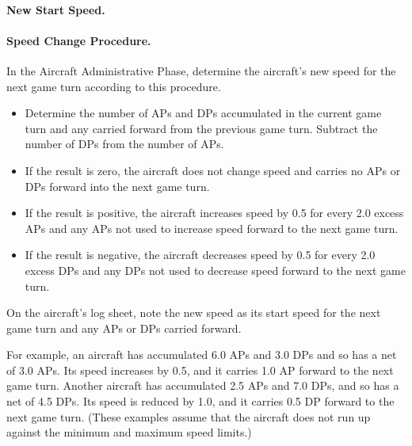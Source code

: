 {\paragraph{New Start Speed.} 

}{

\paragraph{Speed Change Procedure.} 

In the Aircraft Administrative Phase, determine the aircraft’s new speed for the next game turn according to this procedure. 

\begin{itemize}
\item Determine the number of APs and DPs accumulated in the current game turn and any carried forward from the previous game turn. Subtract the number of DPs from the number of APs.

\item If the result is zero, the aircraft does not change speed and carries no APs or DPs forward into the next game turn.

\item If the result is positive, the aircraft increases speed by 0.5 for every 2.0 excess APs and any APs not used to increase speed forward to the next game turn.

\item If the result is negative, the aircraft decreases speed by 0.5 for every 2.0 excess DPs and any DPs not used to decrease speed forward to the next game turn. 

\end{itemize}

On the aircraft’s log sheet, note the new speed as its start speed for the next game turn and any APs or DPs carried forward.

For example, an aircraft has accumulated 6.0 APs and 3.0 DPs and so has a net of 3.0 APs. Its speed increases by 0.5, and it carries 1.0 AP forward to the next game turn. Another aircraft has accumulated 2.5 APs and 7.0 DPs, and so has a net of 4.5 DPs. Its speed is reduced by 1.0, and it carries 0.5 DP  forward to the next game turn. (These examples assume that the aircraft does not run up against the minimum and maximum speed limits.)

}
